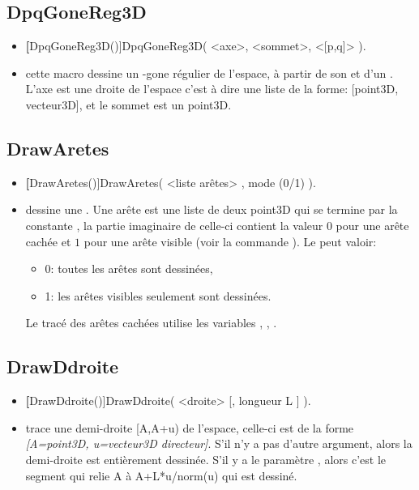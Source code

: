 \subsection{DpqGoneReg3D}
\begin{itemize}
 \item \util \textbf[DpqGoneReg3D()]{DpqGoneReg3D( <axe>, <sommet>, <[p,q]> )}.
 \item \desc cette macro dessine un -gone régulier de l'espace, à partir de son  et d'un . L'axe est une droite de l'espace c'est à dire une liste de la forme: [point3D, vecteur3D], et le sommet est un point3D.
\end{itemize}

\subsection{DrawAretes}
\begin{itemize}
 \item \util \textbf[DrawAretes()]{DrawAretes( <liste arêtes> , mode (0/1) )}.
 \item \desc dessine une . Une arête est une liste de deux point3D qui se termine par la constante \jump, la partie imaginaire de celle-ci contient la valeur $0$ pour une arête cachée et $1$ pour une arête visible (voir la commande ). Le  peut valoir:

  \begin{itemize}
  \item 0: toutes les arêtes sont dessinées,
  \item 1: les arêtes visibles seulement sont dessinées.
  \end{itemize}

Le tracé des arêtes cachées utilise les variables , , .
\end{itemize}

\subsection{DrawDdroite}
\begin{itemize}
 \item \util \textbf[DrawDdroite()]{DrawDdroite( <droite> [, longueur L ] )}.
 \item \desc trace une demi-droite [A,A+u) de l'espace, celle-ci est de la forme \textsl{[A=point3D, u=vecteur3D directeur]}. S'il n'y a pas d'autre argument, alors la demi-droite est entièrement dessinée. S'il y a le paramètre , alors c'est le segment qui relie A à A+L*u/norm(u) qui est dessiné.
\end{itemize}

